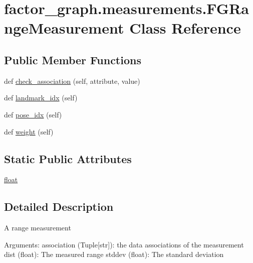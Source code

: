 \hypertarget{classfactor__graph_1_1measurements_1_1FGRangeMeasurement}{}\section{factor\+\_\+graph.\+measurements.\+F\+G\+Range\+Measurement Class Reference}
\label{classfactor__graph_1_1measurements_1_1FGRangeMeasurement}
\subsection*{Public Member Functions}
\begin{DoxyCompactItemize}
\item
def \hyperlink{classfactor__graph_1_1measurements_1_1FGRangeMeasurement_a51c7c56a8d247377d4a1e81047662687}{check\+\_\+association} (self, attribute, value)
\item
def \hyperlink{classfactor__graph_1_1measurements_1_1FGRangeMeasurement_a2c63565913756cd1ecbe224ae0decd2b}{landmark\+\_\+idx} (self)
\item
def \hyperlink{classfactor__graph_1_1measurements_1_1FGRangeMeasurement_ab1d08061854f3d3e497964d2385d8a5f}{pose\+\_\+idx} (self)
\item
def \hyperlink{classfactor__graph_1_1measurements_1_1FGRangeMeasurement_a349bfff649e4a9b0b52cc68296c7f6d5}{weight} (self)
\end{DoxyCompactItemize}
\subsection*{Static Public Attributes}
\begin{DoxyCompactItemize}
\item
\hyperlink{classfactor__graph_1_1measurements_1_1FGRangeMeasurement_a368db610c77571723e4555542fcb62ba}{float}
\end{DoxyCompactItemize}


\subsection{Detailed Description}
\begin{DoxyVerb}A range measurement

Arguments:
    association (Tuple[str]): the data associations of the measurement
    dist (float): The measured range
    stddev (float): The standard deviation
\end{DoxyVerb}


